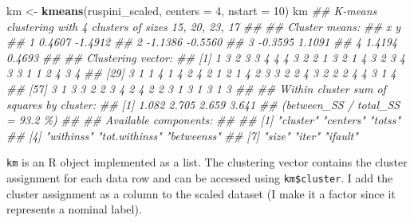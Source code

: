 \documentclass[
  notitlepage]{book}
\newenvironment{Shaded}{\begin{snugshade}}{\end{snugshade}}
\newcommand{\CommentTok}[1]{\textcolor[rgb]{0.56,0.35,0.01}{\textit{#1}}}
\newcommand{\DataTypeTok}[1]{\textcolor[rgb]{0.13,0.29,0.53}{#1}}
\newcommand{\DecValTok}[1]{\textcolor[rgb]{0.00,0.00,0.81}{#1}}
\newcommand{\ErrorTok}[1]{\textcolor[rgb]{0.64,0.00,0.00}{\textbf{#1}}}
\newcommand{\KeywordTok}[1]{\textcolor[rgb]{0.13,0.29,0.53}{\textbf{#1}}}
\newcommand{\NormalTok}[1]{#1}
\newcommand{\OperatorTok}[1]{\textcolor[rgb]{0.81,0.36,0.00}{\textbf{#1}}}
\newcommand{\StringTok}[1]{\textcolor[rgb]{0.31,0.60,0.02}{#1}}
\begin{document}
\begin{Shaded}
\begin{Highlighting}[]
\NormalTok{km \textless{}{-}}\StringTok{ }\KeywordTok{kmeans}\NormalTok{(ruspini\_scaled, }\DataTypeTok{centers =} \DecValTok{4}\NormalTok{, }\DataTypeTok{nstart =} \DecValTok{10}\NormalTok{)}
\NormalTok{km}
\CommentTok{\#\# K{-}means clustering with 4 clusters of sizes 15, 20, 23, 17}
\CommentTok{\#\# }
\CommentTok{\#\# Cluster means:}
\CommentTok{\#\#         x       y}
\CommentTok{\#\# 1  0.4607 {-}1.4912}
\CommentTok{\#\# 2 {-}1.1386 {-}0.5560}
\CommentTok{\#\# 3 {-}0.3595  1.1091}
\CommentTok{\#\# 4  1.4194  0.4693}
\CommentTok{\#\# }
\CommentTok{\#\# Clustering vector:}
\CommentTok{\#\#  [1] 1 3 2 3 3 4 4 4 3 2 2 1 3 2 1 4 3 2 3 4 3 3 1 1 2 4 3 4}
\CommentTok{\#\# [29] 3 1 1 4 1 4 2 4 2 1 2 1 4 2 3 3 2 2 4 3 2 2 2 4 4 3 1 4}
\CommentTok{\#\# [57] 3 1 3 3 2 2 3 4 2 4 2 2 3 1 3 1 3 1 3}
\CommentTok{\#\# }
\CommentTok{\#\# Within cluster sum of squares by cluster:}
\CommentTok{\#\# [1] 1.082 2.705 2.659 3.641}
\CommentTok{\#\#  (between\_SS / total\_SS =  93.2 \%)}
\CommentTok{\#\# }
\CommentTok{\#\# Available components:}
\CommentTok{\#\# }
\CommentTok{\#\# [1] "cluster"      "centers"      "totss"       }
\CommentTok{\#\# [4] "withinss"     "tot.withinss" "betweenss"   }
\CommentTok{\#\# [7] "size"         "iter"         "ifault"}
\end{Highlighting}
\end{Shaded}

\texttt{km} is an R object implemented as a list. The clustering vector
contains the cluster assignment for each data row and can be accessed
using \texttt{km\$cluster}. I add the cluster assignment as a column to the
scaled dataset (I make it a factor since it represents a nominal label).

\begin{Shaded}
\end{Shaded}
\end{document}
